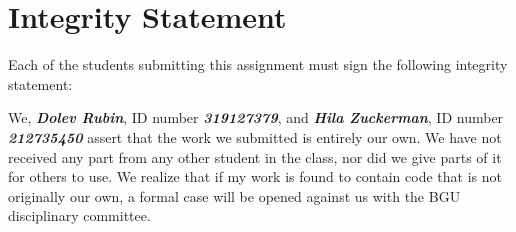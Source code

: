 \documentclass[a4paper]{article}
\theoremstyle{remarksStyle}
\theoremstyle{questionStyle}
\theoremstyle{answerStyle}
\begin{document}
\newpage
\section{Integrity Statement}
Each of the students submitting this assignment must sign the following integrity statement:

\vspace{5ex}
\begin{boxxed}
\textcolor{CB_blue}{
We, \textbf{\textit{Dolev Rubin}}, ID number \textbf{\textit{319127379}}, and \textbf{\textit{Hila Zuckerman}}, ID number \textbf{\textit{212735450}} assert that the work we submitted is entirely our own.
We have not received any part from any other student in the class, nor did we give parts of it for others to use.
We realize that if my work is found to contain code that is not originally our own, a formal case will be opened against us with the BGU disciplinary committee.
}
\end{boxxed}

\vspace{1cm}

\end{document}
